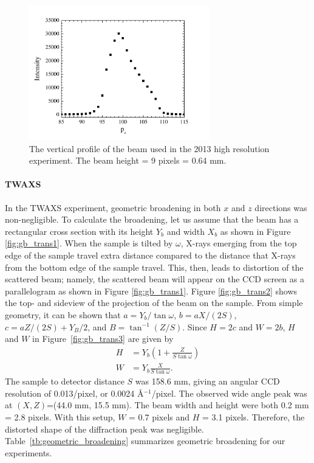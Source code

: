 \begin{figure}[htbp]
  \centering
  \includegraphics[width=0.7\textwidth]{figures/ripple/MMs/waxs/beamz_hr}
  \caption{The vertical profile of the beam used in the 2013 high resolution experiment.
  The beam height = 9 pixels = 0.64 mm.}
  \label{fig:nGIWAXS_beamz}
\end{figure} 

\paragraph{TWAXS}
In the TWAXS experiment, 
geometric broadening in both $x$ and $z$ directions was non-negligible.
To calculate the broadening, let us assume that the beam has a rectangular
cross section with its height $Y_b$ and width $X_b$ as shown in Figure 
\ref{fig:gb_trans1}. When the sample is tilted by $\omega$, X-rays emerging 
from the top edge of the sample travel extra distance compared to the distance 
that X-rays from the bottom edge of the sample travel. This, then, leads to 
distortion of the scattered beam; namely, the scattered beam will appear on 
the CCD screen as a parallelogram as shown in Figure 
\ref{fig:gb_trans1}. 
Figure \ref{fig:gb_trans2} shows the top- and sideview of the 
projection of the beam on the sample. From simple geometry, it can be shown 
that $a=Y_b/\tan\omega$, $b=aX/(2S)$, $c=aZ/(2S)+Y_B/2$, and $B=\tan^{-1}(Z/S)$. 
Since $H=2c$ and $W=2b$, $H$ and $W$ in Figure~\ref{fig:gb_trans3} are 
given by
\begin{align}
	H &= Y_b\left(1+\frac{Z}{S\tan\omega}\right)\\
	W &= Y_b\frac{X}{S\tan\omega}.
\end{align}
The sample to detector distance $S$ was 158.6 mm, giving an angular
CCD resolution of 0.013\textdegree/pixel, 
or 0.0024 \AA$^{-1}$/pixel.
The observed wide angle peak was at $(X,Z)$=(44.0 mm, 15.5 mm). 
The beam width and height were both 0.2 mm = 2.8 pixels.
With this setup, $W$ = 0.7 pixels and $H$ = 3.1 pixels. 
Therefore, the distorted shape of the diffraction peak was negligible.
Table~\ref{tb:geometric_broadening} summarizes geometric broadening for
our experiments.

